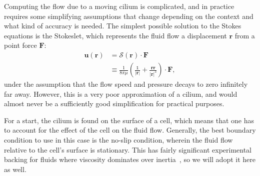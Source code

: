 Computing the flow due to a moving cilium is complicated, and in practice requires some simplifying assumptions that change depending on the context and what kind of accuracy is needed. The simplest possible solution to the Stokes equations is the Stokeslet, which represents the fluid flow a displacement $\mathbf{r}$ from a point force $\mathbf{F}$:
\begin{align}
    \mathbf{u(\mathbf{r})} &= \mathcal{S}(\mathbf{r}) \cdot \mathbf{F} \\
    &\equiv \frac{1}{8\pi\mu} \left( \frac{\mathbb{1}}{\left| \mathbf{r} \right|} + \frac{\mathbf{rr}}{\left| \mathbf{r} \right|^3} \right) \cdot \mathbf{F},\nonumber
\end{align}
under the assumption that the flow speed and pressure decays to zero infinitely far away. However, this is a very poor approximation of a cilium, and would almost never be a sufficiently good simplification for practical purposes. 

For a start, the cilium is found on the surface of a cell, which means that one has to account for the effect of the cell on the fluid flow. Generally, the best boundary condition to use in this case is the no-slip condition, wherein the fluid flow relative to the cell's surface is stationary. This has fairly significant experimental backing for fluids where viscosity dominates over inertia~, so we will adopt it here as well. 

